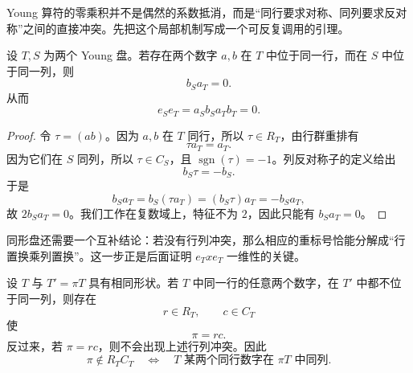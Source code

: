 Young 算符的零乘积并不是偶然的系数抵消，而是“同行要求对称、同列要求反对称”之间的直接冲突。先把这个局部机制写成一个可反复调用的引理。

\begin{lemma}[行列冲突引理]
设 $T,S$ 为两个 Young 盘。若存在两个数字 $a,b$ 在 $T$ 中位于同一行，而在 $S$ 中位于同一列，则
\begin{equation}
b_Sa_T=0.
\label{eq:row-column-collision}
\end{equation}
从而
\[
e_Se_T=a_Sb_Sa_Tb_T=0.
\]

\end{lemma}

\begin{proof}
令 $\tau=(ab)$。因为 $a,b$ 在 $T$ 同行，所以 $\tau\in R_T$，由行群重排有
\[
\tau a_T=a_T.
\]
因为它们在 $S$ 同列，所以 $\tau\in C_S$，且 $\operatorname{sgn}(\tau)=-1$。列反对称子的定义给出
\[
b_S\tau=-b_S.
\]
于是
\[
b_Sa_T=b_S(\tau a_T)=(b_S\tau)a_T=-b_Sa_T,
\]
故 $2b_Sa_T=0$。我们工作在复数域上，特征不为 $2$，因此只能有 $b_Sa_T=0$。
\end{proof}

同形盘还需要一个互补结论：若没有行列冲突，那么相应的重标号恰能分解成“行置换乘列置换”。这一步正是后面证明 $e_Txe_T$ 一维性的关键。

\begin{lemma}[同形盘的行列分解判据]
设 $T$ 与 $T'=\pi T$ 具有相同形状。若 $T$ 中同一行的任意两个数字，在 $T'$ 中都不位于同一列，则存在
\[
r\in R_T,\qquad c\in C_T
\]
使
\begin{equation}
\pi=rc.
\label{eq:row-column-factorization}
\end{equation}
反过来，若 $\pi=rc$，则不会出现上述行列冲突。因此
\[
\pi\notin R_TC_T
\quad\Longleftrightarrow\quad
\text{$T$ 某两个同行数字在 $\pi T$ 中同列}.
\]

\end{lemma}

